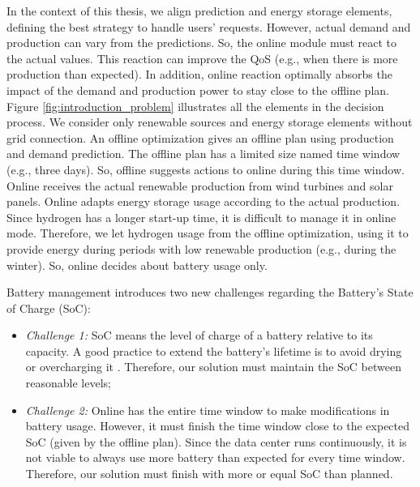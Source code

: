 In the context of this thesis, we align prediction and energy storage elements, defining the best strategy to handle users' requests. However, actual demand and production can vary from the predictions. So, the online module must react to the actual values. This reaction can improve the QoS (e.g., when there is more production than expected). In addition, online reaction optimally absorbs the impact of the demand and production power to stay close to the offline plan. Figure \ref{fig:introduction_problem} illustrates all the elements in the decision process. We consider only renewable sources and energy storage elements without grid connection. An offline optimization gives an offline plan using production and demand prediction. The offline plan has a limited size named time window (e.g., three days). So, offline suggests actions to online during this time window. Online receives the actual renewable production from wind turbines and solar panels. Online adapts energy storage usage according to the actual production. Since hydrogen has a longer start-up time, it is difficult to manage it in online mode. Therefore, we let hydrogen usage from the offline optimization, using it to provide energy during periods with low renewable production (e.g., during the winter). So, online decides about battery usage only. 

Battery management introduces two new challenges regarding the Battery's State of Charge (SoC):

\begin{itemize}
    \item \textit{Challenge 1:} SoC means the level of charge of a battery relative to its capacity. A good practice to extend the battery's lifetime is to avoid drying or overcharging it \cite{xu2016modeling}. Therefore, our solution must maintain the SoC between reasonable levels;
    \item \textit{Challenge 2:} Online has the entire time window to make modifications in battery usage. However, it must finish the time window close to the expected SoC (given by the offline plan). Since the data center runs continuously, it is not viable to always use more battery than expected for every time window. Therefore, our solution must finish with more or equal SoC than planned.
\end{itemize}

